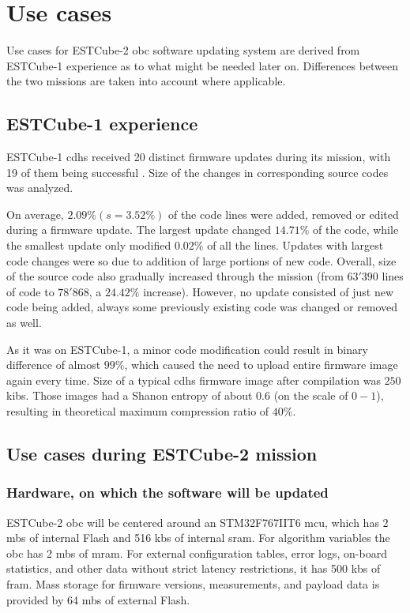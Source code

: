 \newpage
\section{Use cases}

Use cases for ESTCube-2 \gls{obc} software updating system are derived from ESTCube-1 experience as to what might be needed later on. Differences between the two missions are taken into account where applicable.

\subsection{ESTCube-1 experience}

ESTCube-1 \gls{cdhs} received 20 distinct firmware updates during its mission, with 19 of them being successful \cite{Suenter2016}. Size of the changes in corresponding source codes was analyzed.

On average, $2.09\% (s=3.52\%)$ of the code lines were added, removed or edited during a firmware update. The largest update changed $14.71\%$ of the code, while the smallest update only modified $0.02\%$ of all the lines. Updates with largest code changes were so due to addition of large portions of new code. Overall, size of the source code also gradually increased through the mission (from $63'390$ lines of code to $78'868$, a $24.42\%$ increase). However, no update consisted of just new code being added, always some previously existing code was changed or removed as well.

As it was on ESTCube-1, a minor code modification could result in binary difference of almost $99\%$, which caused the need to upload entire firmware image again every time. Size of a typical \gls{cdhs} firmware image after compilation was $250$ \glspl{kib}. Those images had a Shanon entropy of about $0.6$ (on the scale of $0-1$), resulting in theoretical maximum compression ratio of $40\%$. \cite{Suenter2016}

\subsection{Use cases during ESTCube-2 mission}

\subsubsection{Hardware, on which the software will be updated}

ESTCube-2 \gls{obc} will be centered around an STM32F767IIT6 \gls{mcu}, which has 2 \glspl{mb} of internal Flash and 516 \glspl{kb} of internal \gls{sram}. For algorithm variables the \gls{obc} has 2 \glspl{mb} of \gls{mram}. For external configuration tables, error logs, on-board statistics, and other data without strict latency restrictions, it has 500 \glspl{kb} of \gls{fram}. Mass storage for firmware versions, measurements, and payload data is provided by 64 \glspl{mb} of external Flash. \cite{Haljaste2017}

